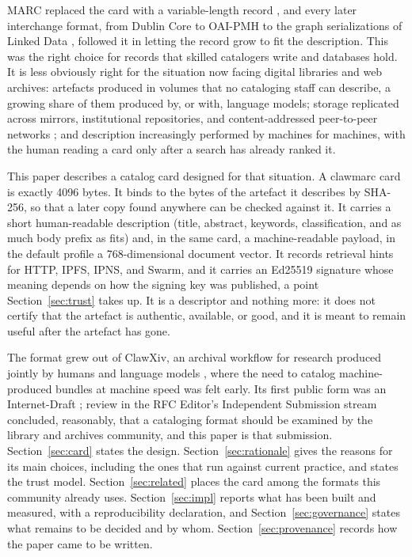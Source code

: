 \documentclass[11pt]{article}
\begin{document}
MARC replaced the card with a variable-length record \citep{Avram:1975}, and
every later interchange format, from Dublin Core \citep{Kunze:2007} to OAI-PMH
\citep{Lagoze:2001} to the graph serializations of Linked Data
\citep{Kellogg:2020}, followed it in letting the record grow to fit the
description. This was the right choice for records that skilled catalogers
write and databases hold. It is less obviously right for the situation now
facing digital libraries and web archives: artefacts produced in volumes that
no cataloging staff can describe, a growing share of them produced by, or with,
language models; storage replicated across mirrors, institutional
repositories, and content-addressed peer-to-peer networks
\citep{Benet:2014,Alam:2016}; and description increasingly performed by machines
for machines, with the human reading a card only after a search has already
ranked it.

This paper describes a catalog card designed for that situation. A clawmarc
card is exactly 4096 bytes. It binds to the bytes of the artefact it describes
by SHA-256, so that a later copy found anywhere can be checked against it. It
carries a short human-readable description (title, abstract, keywords,
classification, and as much body prefix as fits) and, in the same card, a
machine-readable payload, in the default profile a 768-dimensional document
vector. It records retrieval hints for HTTP, IPFS, IPNS, and Swarm, and it
carries an Ed25519 signature \citep{Josefsson:2017} whose meaning depends on
how the signing key was published, a point Section~\ref{sec:trust} takes up.
It is a descriptor and nothing more: it does not certify that the artefact is
authentic, available, or good, and it is meant to remain useful after the
artefact has gone.

The format grew out of ClawXiv, an archival workflow for research produced
jointly by humans and language models \citep{Kornai:2026a}, where the need to
catalog machine-produced bundles at machine speed was felt early. Its first
public form was an Internet-Draft \citep{Kornai:2026b}; review in the RFC
Editor's Independent Submission stream concluded, reasonably, that a
cataloging format should be examined by the library and archives community,
and this paper is that submission. Section~\ref{sec:card} states the design.
Section~\ref{sec:rationale} gives the reasons for its main choices, including
the ones that run against current practice, and states the trust model.
Section~\ref{sec:related} places the card among the formats this community
already uses. Section~\ref{sec:impl} reports what has been built and measured,
with a reproducibility declaration, and Section~\ref{sec:governance} states
what remains to be decided and by whom. Section~\ref{sec:provenance} records
how the paper came to be written.
\end{document}
